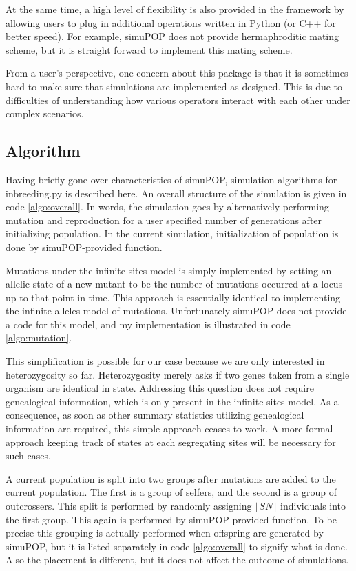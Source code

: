 \documentclass[12pt]{article}
\begin{document}
At the same time, a high level of flexibility is also provided in the
framework by allowing users to plug in additional operations written
in Python (or C++ for better speed).
For example, simuPOP does not provide hermaphroditic mating scheme,
but it is straight forward to implement this mating scheme.

From a user's perspective, one concern about this package is that it
is sometimes hard to make sure that simulations are implemented as
designed.
This is due to difficulties of understanding how various operators
interact with each other under complex scenarios.

\subsection{Algorithm}
\label{sec:algorithm}

Having briefly gone over characteristics of simuPOP, simulation
algorithms for inbreeding.py is described here.
An overall structure of the simulation is given in code \ref{algo:overall}.
In words, the simulation goes by alternatively performing
mutation and reproduction for a user specified number of generations
after initializing population.
In the current simulation, initialization of population is done by
simuPOP-provided function.

Mutations under the infinite-sites model is simply implemented by
setting an allelic state of a new mutant to be the number of mutations
occurred at a locus up to that point in time.
This approach is essentially identical to implementing the
infinite-alleles model of mutations.
Unfortunately simuPOP does not provide a code for this model,
and my implementation is illustrated in code \ref{algo:mutation}.

This simplification is possible for our case because we are only
interested in heterozygosity so far.
Heterozygosity merely asks if two genes taken from a single organism
are identical in state.
Addressing this question does not require genealogical information,
which is only present in the infinite-sites model.
As a consequence, as soon as other summary statistics utilizing
genealogical information are required, this simple approach ceases to
work.
A more formal approach keeping track of states at each segregating
sites will be necessary for such cases.

A current population is split into two groups after mutations are
added to the current population.
The first is a group of selfers, and the second is a group of
outcrossers.
This split is performed by randomly assigning \(\lfloor S N\rfloor\)
individuals into the first group.
This again is performed by simuPOP-provided function.
To be precise this grouping is actually performed when offspring are
generated by simuPOP, but it is listed separately in code
\ref{algo:overall} to signify what is done.
Also the placement is different, but it does not affect the outcome of
simulations.
\end{document}
